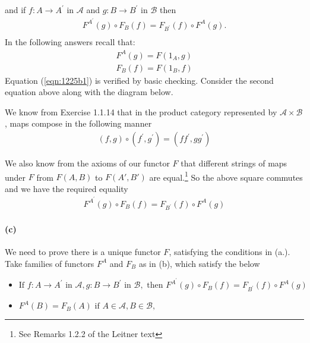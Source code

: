\documentclass{article}
\begin{document}
and if $f: A \rightarrow A^{\prime}$ in $\mathcal{A}$ and $g: B \rightarrow B^\prime$ in
$\mathcal{B}$ then
\begin{align*}
F^{A^{\prime}}(g) \circ F_B(f) = F_{B^\prime}(f) \circ F^A(g). \\
\end{align*}
In the following answers recall that:
\begin{align*}
  F^A(g) = F(1_A, g) \\
  F_B(f) = F(1_B, f)
\end{align*}
Equation (\ref{eqn:1225b1}) is verified by basic checking. Consider the second equation above along with the diagram below.

\begin{center}
\end{center}

We know from Exercise 1.1.14 that in the product category represented by $\mathcal{A} \times \mathcal{B}$, maps compose in the following manner
\begin{align*}
  (f, g) \circ (f^{\prime},g^{\prime}) = (ff^{\prime}, gg^{\prime})
\end {align*}

We also know from the axioms of our functor $F$ that different strings of maps under $F$ from $F(A,B)$ to $F(A',B')$ are equal.\footnote{See Remarks 1.2.2 of the Leitner text} So the above square commutes and we have the required equality
\begin{align*}
  F^{A^{\prime}}(g) \circ F_B(f) = F_{B^\prime}(f) \circ F^A(g)
\end{align*}

\paragraph{(c)}

We need to prove there is a unique functor $F$, satisfying the conditions in (a.). Take families of functors $F^A$ and $F_B$ as in (b), which satisfy the below

\begin{itemize}
\item $ \text{If }f\colon A \rightarrow A^{\prime} \text{ in } \mathcal{A}, g\colon B \rightarrow B^{\prime} \text{ in } \mathcal{B}, \text{ then } F^{A^{\prime}}(g) \circ F_B(f) = F_{B^\prime}(f) \circ F^A(g)$
\item $F^A(B) = F_B(A) \text{ if } A \in \mathcal{A}, B \in \mathcal{B},$
\end{itemize}
\end{document}
